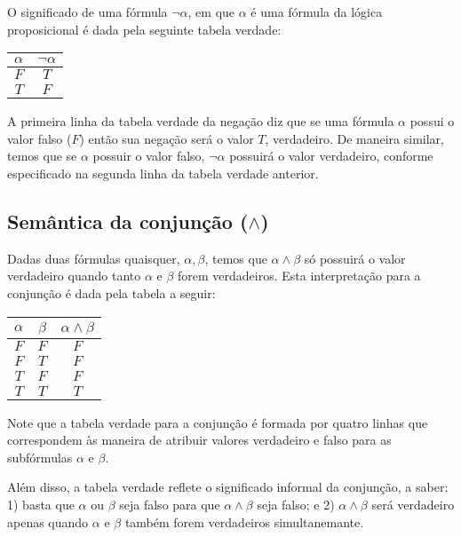 O significado de uma f\'ormula $\neg \alpha$, em que $\alpha$ \'e uma
f\'ormula da l\'ogica proposicional \'e dada pela seguinte tabela
verdade:
\begin{table}[h]
  \begin{tabular}{|c|c|}
    \hline
    $\alpha$ & $\neg \alpha$ \\ \hline
    $F$         & $T$ \\ \hline
    $T$         & $F$ \\ \hline
  \end{tabular}
  \centering
\end{table}
A primeira linha da tabela verdade da nega\c{c}\~ao diz que se uma
f\'ormula $\alpha$ possui o valor falso ($F$) ent\~ao sua
nega\c{c}\~ao ser\'a o valor $T$, verdadeiro. De maneira similar,
temos que se $\alpha$ possuir o valor falso, $\neg \alpha$ possuir\'a
o valor verdadeiro, conforme especificado na segunda linha da tabela
verdade anterior.

\subsection{Sem\^antica da conjun\c{c}\~ao ($\land$)}

Dadas duas f\'ormulas quaisquer, $\alpha,\beta$, temos que
$\alpha\land\beta$ s\'o possuir\'a o valor verdadeiro quando tanto
$\alpha$ e $\beta$ forem verdadeiros. Esta interpreta\c{c}\~ao para a
conjun\c{c}\~ao \'e dada pela tabela a seguir:
\begin{table}[h]
  \begin{tabular}{|c|c|c|}
    \hline
    $\alpha$ & $\beta$ & $\alpha \land \beta$\\ \hline
    $F$         & $F$        & $F$ \\ \hline
    $F$         & $T$        & $F$ \\ \hline
    $T$         & $F$        & $F$ \\ \hline
    $T$         & $T$        & $T$ \\ \hline
   \end{tabular}
  \centering
\end{table}
Note que a tabela verdade para a conjun\c{c}\~ao \'e formada por
quatro linhas que correspondem \`as maneira de atribuir valores
verdadeiro e falso para as subf\'ormulas $\alpha$ e $\beta$.

Al\'em disso, a tabela verdade reflete o significado informal da
conjun\c{c}\~ao, a saber: 1) basta que $\alpha$ ou $\beta$ seja falso
para que $\alpha\land\beta$ seja falso; e 2) $\alpha\land\beta$ ser\'a
verdadeiro apenas quando $\alpha$ e $\beta$ tamb\'em forem verdadeiros
simultanemante.

